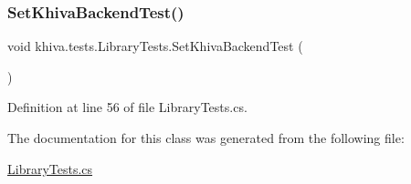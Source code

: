\subsubsection{\texorpdfstring{Set\+Khiva\+Backend\+Test()}{SetKhivaBackendTest()}}
{\footnotesize\ttfamily void khiva.\+tests.\+Library\+Tests.\+Set\+Khiva\+Backend\+Test (\begin{DoxyParamCaption}{ }\end{DoxyParamCaption})\hspace{0.3cm}{\ttfamily [inline]}}



Definition at line 56 of file Library\+Tests.\+cs.



The documentation for this class was generated from the following file\+:\begin{DoxyCompactItemize}
\item 
\mbox{\hyperlink{_library_tests_8cs}{Library\+Tests.\+cs}}\end{DoxyCompactItemize}
